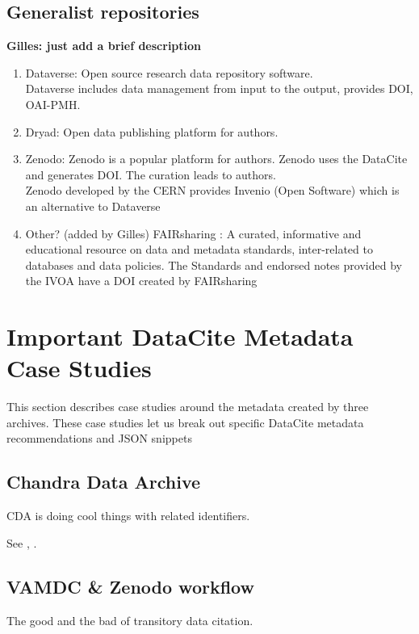 \documentclass[11pt,a4paper]{ivoa}
\begin{document}
\subsection{Generalist repositories}
\textbf{\color{red}Gilles: just add a brief description}\\

\begin{enumerate}
	\item Dataverse: Open source research data repository software.\\
	Dataverse includes data management from input to the output, provides DOI, OAI-PMH.
	\item Dryad: Open data publishing platform for authors.
	\item Zenodo: Zenodo is a popular platform for authors. Zenodo uses the DataCite and generates DOI. The curation leads to authors.\\
	Zenodo developed by the CERN provides Invenio (Open Software) which is an alternative to Dataverse 
	\item Other? {\color{red} (added by Gilles) FAIRsharing \cite{https://doi.org/10.25504/fairsharing.rd6gxr}: A curated, informative and educational resource on data and metadata standards, inter-related to databases and data policies. The Standards and endorsed notes provided by the IVOA have a DOI created by FAIRsharing}
\end{enumerate}


\section{Important DataCite Metadata Case Studies}
This section describes case studies around the metadata created by three archives. 
These case studies let us break out specific DataCite metadata recommendations and JSON snippets

\subsection{Chandra Data Archive}
CDA is doing cool things with related identifiers.

See \citep{2023ChNew..34....5D}, \citep{2018EPJWC.18612011R}.

	
\subsection{VAMDC \& Zenodo workflow}
The good and the bad of transitory data citation.
\end{document}
